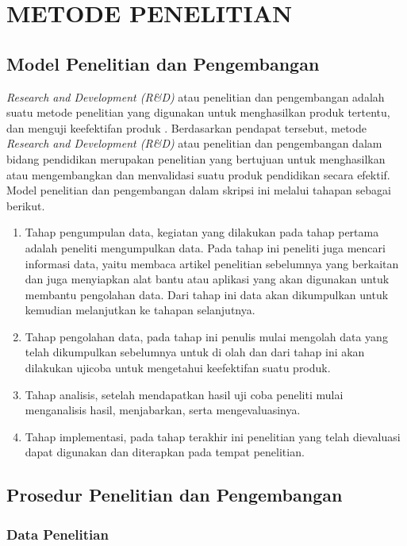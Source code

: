 \chapter{METODE PENELITIAN}

\section{Model Penelitian dan Pengembangan}

\textit{Research and Development (R\&D)} atau penelitian dan pengembangan adalah suatu metode penelitian yang digunakan untuk menghasilkan produk tertentu, dan menguji keefektifan produk \cite{sugiyono2013metode}. 
Berdasarkan pendapat tersebut, metode \textit{Research and Development (R\&D)} atau penelitian dan pengembangan dalam bidang pendidikan merupakan penelitian yang bertujuan untuk menghasilkan atau mengembangkan dan menvalidasi suatu produk pendidikan secara efektif.
Model penelitian dan pengembangan dalam skripsi ini melalui tahapan sebagai berikut.

\begin{enumerate}
	\item Tahap pengumpulan data, kegiatan yang dilakukan pada tahap pertama adalah peneliti mengumpulkan data. Pada tahap ini peneliti juga mencari informasi data, yaitu membaca artikel penelitian sebelumnya yang berkaitan dan juga menyiapkan alat bantu atau aplikasi yang akan digunakan untuk membantu pengolahan data. Dari tahap ini data akan dikumpulkan untuk kemudian melanjutkan ke tahapan selanjutnya.
	\item Tahap pengolahan data, pada tahap ini penulis mulai mengolah data yang telah dikumpulkan sebelumnya untuk di olah dan dari tahap ini akan dilakukan ujicoba untuk mengetahui keefektifan suatu produk.
	\item Tahap analisis, setelah mendapatkan hasil uji coba peneliti mulai menganalisis hasil, menjabarkan, serta mengevaluasinya.
	\item Tahap implementasi, pada tahap terakhir ini penelitian yang telah dievaluasi dapat digunakan dan diterapkan pada tempat penelitian.
\end{enumerate}

\section{Prosedur Penelitian dan Pengembangan}


\subsection{Data Penelitian}
    
